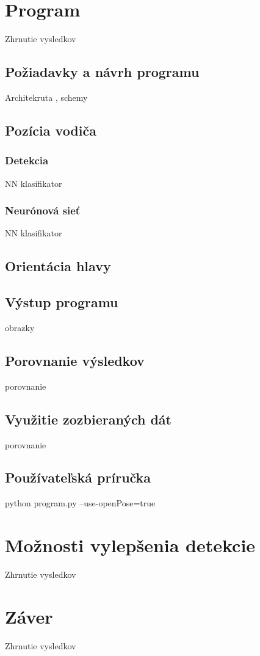 \documentclass[slovak,master,dept460,male,cpp,cpdeclaration]{diploma}
\begin{document}
\newpage
\section{Program}
\label{sec:Program}
Zhrnutie vysledkov


\newpage
\subsection{Požiadavky a návrh programu}
Architekruta , schemy


\newpage
\subsection{Pozícia vodiča}


\newpage
\subsubsection{Detekcia}
NN klasifikator


\newpage
\subsubsection{Neurónová sieť}
NN klasifikator



\newpage
\subsection{Orientácia hlavy}


\newpage
\subsection{Výstup programu}
obrazky

\newpage
\subsection{Porovnanie výsledkov}
porovnanie


\newpage
\subsection{Využitie zozbieraných dát}
porovnanie


\newpage
\subsection{Používateľská príručka}
python program.py --use-openPose=true


\newpage
\section{Možnosti vylepšenia detekcie}
\label{sec:Možnosti vylepšenia detekcie}
Zhrnutie vysledkov


\newpage
\section{Záver}
\label{sec:Zaver}
Zhrnutie vysledkov









\end{document}
